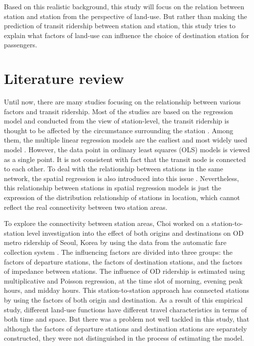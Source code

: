 Based on this realistic background, this study will focus on the relation between station and station from the perspective of land-use. But rather than making the prediction of transit ridership between station and station, this study tries to explain what factors of land-use can influence the choice of destination station for passengers. 

\section{Literature review}
%
Until now, there are many studies focusing on the relationship between various factors and transit ridership. Most of the studies are based on the regression model and conducted from the view of station-level, the transit ridership is thought to be affected by the circumstance surrounding the station \cite{cervero1997travel,taylor2003analyzing,zhao2005transit,estupinan2008relationship,taylor2009nature,sohn2010factors,gutierrez2011transit,jun2015land}. Among them, the multiple linear regression models are the earliest and most widely used model \cite{cervero1997travel,gutierrez2011transit}. However, the data point in ordinary least squares (OLS) models is viewed as a single point. It is not consistent with fact that the transit node is connected to each other. To deal with the relationship between stations in the same network, the spatial regression is also introduced into this issue \cite{cardozo2012application,jun2015land}. Nevertheless, this relationship between stations in spatial regression models is just the expression of the distribution relationship of stations in location, which cannot reflect the real connectivity between two station areas.

%
To explore the connectivity between station areas, Choi worked on a station-to-station level investigation into the effect of both origins and destinations on OD metro ridership of Seoul, Korea by using the data from the automatic fare collection system \cite{choi2012analysis}. The influencing factors are divided into three groups: the factors of departure stations, the factors of destination stations, and the factors of impedance between stations. The influence of OD ridership is estimated using multiplicative and Poisson regression, at the time slot of morning, evening peak hours, and midday hours. This station-to-station approach has connected stations by using the factors of both origin and destination. As a result of this empirical study, different land-use functions have different travel characteristics in terms of both time and space. But there was a problem not well tackled in this study, that although the factors of departure stations and destination stations are separately constructed, they were not distinguished in the process of estimating the model. 

